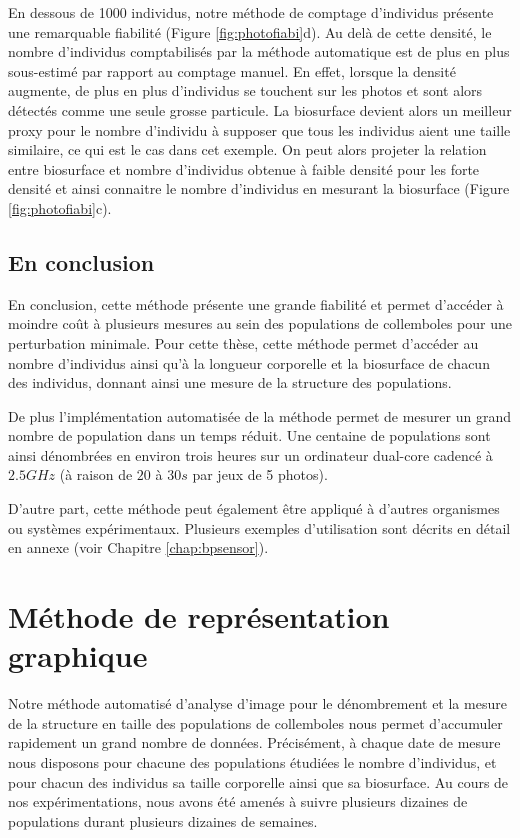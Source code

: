 En dessous de 1000 individus, notre méthode de comptage d'individus présente une
remarquable fiabilité (Figure \ref{fig:photofiabi}d). Au delà de cette densité,
le nombre d'individus comptabilisés par la méthode automatique est de plus en
plus sous-estimé par rapport au comptage manuel. En effet, lorsque la densité
augmente, de plus en plus d'individus se touchent sur les photos et sont alors
détectés comme une seule grosse particule. La biosurface devient alors un
meilleur proxy pour le nombre d'individu à supposer que tous les individus aient
une taille similaire, ce qui est le cas dans cet exemple. On peut alors projeter
la relation entre biosurface et nombre d'individus obtenue à faible densité pour
les forte densité et ainsi connaitre le nombre d'individus en mesurant la
biosurface (Figure \ref{fig:photofiabi}c).

\subsection{En conclusion}

En conclusion, cette méthode présente une grande fiabilité et permet d'accéder à
moindre coût à plusieurs mesures au sein des populations de collemboles pour une
perturbation minimale. Pour cette thèse, cette méthode permet d'accéder au
nombre d'individus ainsi qu'à la longueur corporelle et la biosurface de chacun
des individus, donnant ainsi une mesure de la structure des populations. 

De plus l'implémentation automatisée de la méthode permet de mesurer un grand
nombre de population dans un temps réduit. Une centaine de populations sont
ainsi dénombrées en environ trois heures sur un ordinateur dual-core cadencé à
$2.5GHz$ (à raison de $20$ à $30s$ par jeux de 5 photos).

D'autre part, cette méthode peut également être appliqué à d'autres organismes
ou systèmes expérimentaux. Plusieurs exemples d'utilisation sont décrits en
détail en annexe (voir Chapitre \ref{chap:bpsensor}).

\section{Méthode de représentation graphique}

Notre méthode automatisé d'analyse d'image pour le dénombrement et la mesure de
la structure en taille des populations de collemboles nous permet d'accumuler
rapidement un grand nombre de données. Précisément, à chaque date de mesure nous
disposons pour chacune des populations étudiées le nombre d'individus, et pour
chacun des individus sa taille corporelle ainsi que sa biosurface. Au cours de
nos expérimentations, nous avons été amenés à suivre plusieurs dizaines de
populations durant plusieurs dizaines de semaines.
